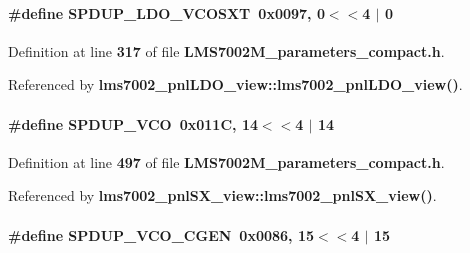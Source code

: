 \paragraph[{S\+P\+D\+U\+P\+\_\+\+L\+D\+O\+\_\+\+V\+C\+O\+S\+XT}]{\setlength{\rightskip}{0pt plus 5cm}\#define S\+P\+D\+U\+P\+\_\+\+L\+D\+O\+\_\+\+V\+C\+O\+S\+XT~0x0097, 0$<$$<$4 $\vert$  0}\label{LMS7002M__parameters__compact_8h_abf4eebb00f60ca98c1a38365edced659}


Definition at line {\bf 317} of file {\bf L\+M\+S7002\+M\+\_\+parameters\+\_\+compact.\+h}.



Referenced by {\bf lms7002\+\_\+pnl\+L\+D\+O\+\_\+view\+::lms7002\+\_\+pnl\+L\+D\+O\+\_\+view()}.

\paragraph[{S\+P\+D\+U\+P\+\_\+\+V\+CO}]{\setlength{\rightskip}{0pt plus 5cm}\#define S\+P\+D\+U\+P\+\_\+\+V\+CO~0x011\+C, 14$<$$<$4 $\vert$  14}\label{LMS7002M__parameters__compact_8h_a84dc31bbed1e1055e8d94f4799e0f79e}


Definition at line {\bf 497} of file {\bf L\+M\+S7002\+M\+\_\+parameters\+\_\+compact.\+h}.



Referenced by {\bf lms7002\+\_\+pnl\+S\+X\+\_\+view\+::lms7002\+\_\+pnl\+S\+X\+\_\+view()}.

\paragraph[{S\+P\+D\+U\+P\+\_\+\+V\+C\+O\+\_\+\+C\+G\+EN}]{\setlength{\rightskip}{0pt plus 5cm}\#define S\+P\+D\+U\+P\+\_\+\+V\+C\+O\+\_\+\+C\+G\+EN~0x0086, 15$<$$<$4 $\vert$  15}\label{LMS7002M__parameters__compact_8h_ababda7c76ed8617a5ea0c78f313dc12f}


